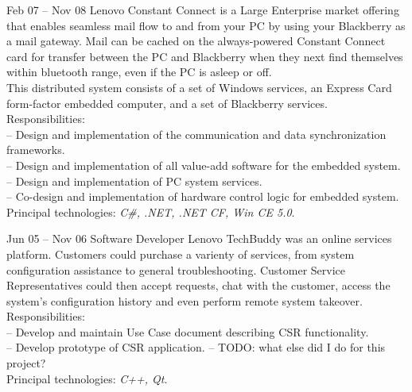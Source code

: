 \documentclass[letterpaper, 11pt]{article}
\begin{document}
\begin{resume}
\begin{block}
\begin{subcategory}{Feb 07 -- Nov 08}
                Lenovo Constant Connect is a Large Enterprise market offering that enables
                seamless mail flow to and from your PC by using your Blackberry as a mail
                gateway.  Mail can be cached on the always-powered Constant Connect card for
                transfer between the PC and Blackberry when they next find themselves within
                bluetooth range, even if the PC is asleep or off.
                \\[1ex]
                This distributed system consists of a set of Windows services, an Express Card
                form-factor embedded computer, and a set of Blackberry services.
                \\[1ex]
                Responsibilities: \\
                -- Design and implementation of the communication and data synchronization frameworks. \\
                -- Design and implementation of all value-add software for the embedded system. \\
                -- Design and implementation of PC system services. \\
                -- Co-design and implementation of hardware control logic for embedded system.
                \\[1ex]
                Principal technologies: \emph{C\#, .NET, .NET CF, Win CE 5.0}.
                \bigskip
            \end{subcategory}
            \begin{subcategory}{Jun 05 -- Nov 06}
                 {Software Developer}
                Lenovo TechBuddy was an online services platform.  Customers could purchase
                a varienty of services, from system configuration assistance to general
                troubleshooting.  Customer Service Representatives could then accept requests,
                chat with the customer, access the system's configuration history and even
                perform remote system takeover.
                \\[1ex]
                Responsibilities: \\
                -- Develop and maintain Use Case document describing CSR functionality. \\
                -- Develop prototype of CSR application.
                -- TODO: what else did I do for this project?
                \\[1ex]
                Principal technologies: \emph{C++, Qt}.

\end{subcategory}
\end{block}
\end{resume}
\end{document}

